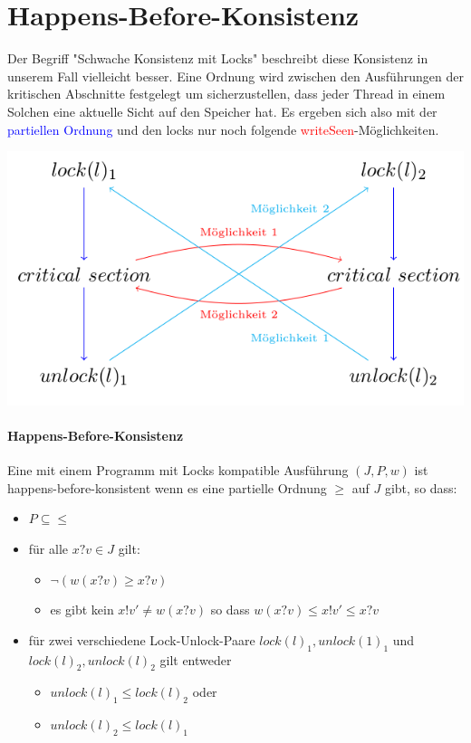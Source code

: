 \documentclass[a4paper,10pt, oneside]{book}
\begin{document}
\section{Happens-Before-Konsistenz}
Der Begriff "Schwache Konsistenz mit Locks" beschreibt diese Konsistenz in unserem Fall vielleicht besser. Eine Ordnung wird zwischen den Ausführungen der kritischen Abschnitte festgelegt um sicherzustellen, dass jeder Thread in einem Solchen eine aktuelle Sicht auf den Speicher hat. Es ergeben sich also mit der \textcolor{blue}{partiellen Ordnung} und den locks nur noch folgende \textcolor{red}{writeSeen}-Möglichkeiten.

\begin{center}
\includegraphics[scale=0.4]{happensBeforeDia}
\end{center}

\paragraph{Happens-Before-Konsistenz}
Eine mit einem Programm mit Locks kompatible Ausführung $(J,P,w)$ ist happens-before-konsistent wenn es eine partielle Ordnung $\geq$ auf $J$ gibt, so dass:
\begin{itemize}
	\item $P \subseteq \leq$
	\item für alle $x?v \in J$ gilt:
	\begin{itemize}
		\item $\neg(w(x?v) \geq x?v)$
		\item es gibt kein $x!v' \not= w(x?v)$ so dass $w(x?v) \leq x!v' \leq x?v$
	\end{itemize}
	\item für zwei verschiedene Lock-Unlock-Paare $lock(l)_1, unlock(1)_1$ und $lock(l)_2, unlock(l)_2$ gilt entweder
	\begin{itemize}
		\item $unlock(l)_1 \leq lock(l)_2$ oder
		\item $unlock(l)_2 \leq lock(l)_1$
	\end{itemize}
\end{itemize}
\end{document}
